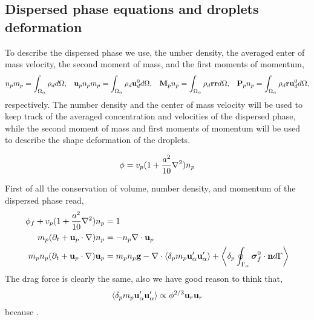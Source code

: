  

\subsection{Dispersed phase equations and droplets deformation}

To describe the dispersed phase we use, the umber density, the averaged enter of mass velocity, the second moment of mass, and the first moments of momentum, 
\begin{align}
    n_p m_p 
    =
    \int_{\Omega_{\alpha}} \rho_d d\Omega,
    &&\textbf{u}_p n_p m_p 
    =
    \int_{\Omega_{\alpha}} \rho_d \textbf{u}_d^0 d\Omega,
    && \textbf{M}_p n_p 
    =
    \int_{\Omega_{\alpha}} \rho_d \textbf{rr}  d\Omega,
    && \textbf{P}_p n_p 
    =
    \int_{\Omega_{\alpha}} \rho_d \textbf{r} \textbf{u}_d^0 d\Omega,
\end{align} 
respectively. 
The number density and the center of mass velocity will be used to keep track of the averaged concentration and velocities of the dispersed phase, while the second moment of mass and first moments of momentum will be used to describe the shape deformation of the droplets. 

\begin{equation}
    \phi = v_p (1 + \frac{a^2}{10} \mathbf{\nabla}^2 )n_p
\end{equation}

First of all the conservation of volume,  number density, and momentum of the dispersed phase read, 
\begin{align}
    \phi_f + v_p (1 + \frac{a^2}{10} \mathbf{\nabla}^2 )n_p 
    &= 1\\
    m_p(\partial_t + \textbf{u}_p \cdot \mathbf{\nabla})n_p
    &=
    - n_p \mathbf{\nabla}\cdot \textbf{u}_p\\
    m_p n_p(\partial_t + \textbf{u}_p \cdot \mathbf{\nabla})\textbf{u}_p
    &=
    m_p n_p \textbf{g}
    - \mathbf{\nabla}\cdot \left<\delta_p m_p \textbf{u}_\alpha'\textbf{u}_\alpha'\right>
    + \left<\delta_p \oint_{\Gamma_{\alpha}} \bm\sigma_f^0 \cdot \textbf{n} d\Gamma\right>
\end{align}
The drag force is clearly the same, also we have good reason to think that, 
\begin{equation}
    \left<\delta_p m_p \textbf{u}_\alpha'\textbf{u}_\alpha'\right>
    \propto 
    \phi^{2/3} \textbf{u}_r\textbf{u}_r
\end{equation}
because \citet{guazzelli2011fluctuations}. 

